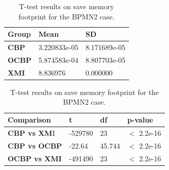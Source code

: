 \documentclass{llncs}
\begin{document}
\begin{table}[ht]
    \centering
    \label{table:ttest_save_memory_bpmn2}
    \caption{T-test results on save memory footprint for the BPMN2 case.}
    \begin{minipage}{0.44\textwidth}
        \centering
        \begin{tabular}{|p{}|p{}|p{}|}
            \hline 
            \textbf{Group}  & \textbf{Mean} & \textbf{SD} \\ 
            \hline 
            \textbf{CBP} & 3.220833e-05  & 8.171689e-05 \\ 
            \hline 
            \textbf{OCBP} & 5.874583e-04 & 8.807703e-05  \\ 
            \hline 
            \textbf{XMI} & 8.836976   & 0.000000 \\ 
            \hline 
        \end{tabular} 
    \end{minipage}
    \hfill
    \begin{minipage}{0.54\textwidth}
        \centering
        \begin{tabular}{|p{}|p{}|p{}|p{}|}
            \hline 
            \textbf{Comparison} & \textbf{t}  & \textbf{df} & \textbf{p-value} \\ 
            \hline 
            \textbf{CBP vs XM}I & -529780  & 23 & $<$ 2.2e-16 \\ 
            \hline 
            \textbf{CBP vs OCBP} & -22.64 & 45.744 & $<$ 2.2e-16 \\ 
            \hline 
            \textbf{OCBP vs XMI} & -491490   & 23  & $<$ 2.2e-16 \\ 
            \hline 
        \end{tabular} 
    \end{minipage}
\end{table}
\end{document}
